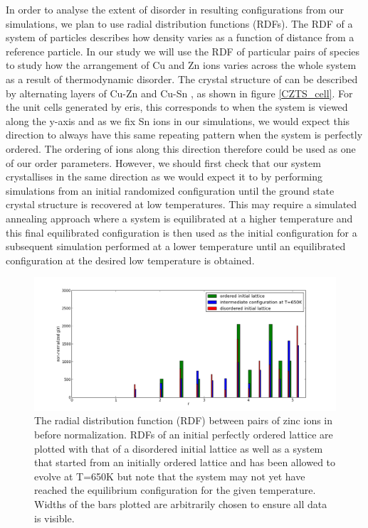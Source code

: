 In order to analyse the extent of disorder in resulting configurations from our simulations, we plan to use radial distribution functions (RDFs). The RDF of a system of particles describes how density varies as a function of distance from a reference particle. In our study we will use the RDF of particular pairs of species to study how the arrangement of Cu and Zn ions varies across the whole system as a result of thermodynamic disorder.
The crystal structure of {\CZTS } can be described by alternating layers of Cu-Zn and Cu-Sn \cite{Schorr}, as shown in figure \ref{CZTS_cell}. For the unit cells generated by eris, this corresponds to when the system is viewed along the y-axis and as we fix Sn ions in our simulations, we would expect this direction to always have this same repeating pattern when the system is perfectly ordered. The ordering of ions along this direction therefore could be used as one of our order parameters. However, we should first check that our system crystallises in the same direction as we would expect it to by performing simulations from an initial randomized configuration until the ground state crystal structure is recovered at low temperatures. This may require a simulated annealing approach where a system is equilibrated at a higher temperature and this final equilibrated configuration is then used as the initial configuration for a subsequent simulation performed at a lower temperature until an equilibrated configuration at the desired low temperature is obtained.

\begin{figure}[h!]
  \centering
    \includegraphics[width=1.0\textwidth]{figures/RDF_Z-Z.png}
    \caption{The radial distribution function (RDF) between pairs of zinc ions in {\CZTS} before normalization. RDFs of an initial perfectly ordered lattice are plotted with that of a disordered initial lattice as well as a system that started from an initially ordered lattice and has been allowed to evolve at T=650K but note that the system may not yet have reached the equilibrium configuration for the given temperature. Widths of the bars plotted are arbitrarily chosen to ensure all data is visible.}
  \label{RDF_Z-Z}
\end{figure}

